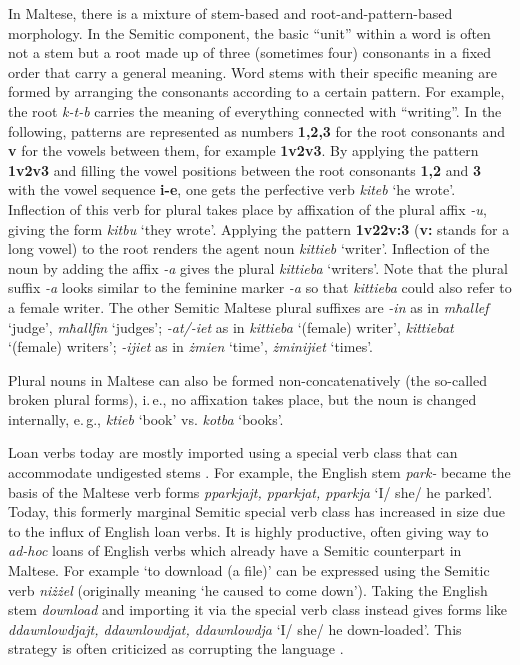 \documentclass[]{../../metanetpaper}
\begin{document}
\begin{multicols}{2}
In Maltese, there is a mixture of stem-based and root-and-pattern-based morphology. In the Semitic component, the basic ``unit'' within a word is often not a stem but a root made up of three (sometimes four) consonants in a fixed order that carry a general meaning. Word stems with their specific meaning are formed by arranging the consonants according to a certain pattern. For example, the root \emph{k-t-b} carries the meaning of everything connected with ``writing''. In the following, patterns are represented as numbers \textbf{1,2,3} for the root consonants and \textbf{v} for the vowels between them, for example \textbf{1v2v3}. By applying the pattern \textbf{1v2v3} and filling the vowel positions between the root consonants \textbf{1,2} and \textbf{3} with the vowel sequence \textbf{i-e}, one gets the perfective verb \emph{kiteb} `he wrote'. Inflection of this verb for plural takes place by affixation of the plural affix \emph{-u}, giving the form \emph{kitbu} `they wrote'. Applying the pattern \textbf{1v22v:3} (\textbf{v:} stands for a long vowel) to the root renders the agent noun \emph{kittieb} `writer'. Inflection of the noun by adding the affix \emph{-a} gives the plural \emph{kittieba} `writers'. Note that the plural suffix \emph{-a} looks similar to the feminine marker \emph{-a} so that \emph{kittieba} could also refer to a female writer. The other Semitic Maltese plural suffixes are \emph{-in} as in \emph{mħallef} `judge', \emph{mħallfin} `judges'; \emph{-at/-iet} as in \emph{kittieba} `(female) writer', \emph{kittiebat} `(female) writers'; \emph{-ijiet} as in \emph{żmien} `time', \emph{żminijiet} `times'.

Plural nouns in Maltese can also be formed non-concatenatively (the so-called broken plural forms), i.\,e., no affixation takes place, but the noun is changed internally, e.\,g., \emph{ktieb} `book' vs. \emph{kotba} `books'.

Loan verbs today are mostly imported using a special verb class that can accommodate undigested stems \cite{Mifsud:1995}. For example, the English stem \emph{park-} became the basis of the Maltese verb forms \emph{pparkjajt, pparkjat, pparkja} `I/ she/ he parked'. Today, this formerly marginal Semitic special verb class has increased in size due to the influx of English loan verbs. It is highly productive, often giving way to \emph{ad-hoc} loans of English verbs which already have a Semitic counterpart in Maltese. For example `to download (a file)' can be expressed using the Semitic verb \emph{niżżel} (originally meaning `he caused to come down'). Taking the English stem \emph{download} and importing it via the special verb class instead gives forms like \emph{ddawnlowdjajt, ddawnlowdjat, ddawnlowdja} `I/ she/ he down-loaded'. This strategy is often criticized as corrupting the language \cite{Fabri:2011a}.


\end{multicols}
\end{document}
